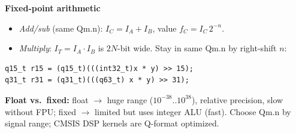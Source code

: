 \textbf{Fixed-point arithmetic}
\begin{itemize}
\item \emph{Add/sub} (same Qm.n): $I_C = I_A + I_B$, value $f_C = I_C\,2^{-n}$.
\item \emph{Multiply}: $I_T = I_A\cdot I_B$ is $2N$-bit wide. Stay in same Qm.n by right-shift $n$:
\end{itemize}
\begin{lstlisting}[language={}]
q15_t r15 = (q15_t)(((int32_t)x * y) >> 15);
q31_t r31 = (q31_t)(((q63_t) x * y) >> 31);
\end{lstlisting}

\textbf{Float vs.\ fixed:} float $\to$ huge range ($10^{-38}\!..\!10^{38}$), relative precision, slow without FPU; fixed $\to$ limited but uses integer ALU (fast). Choose Qm.n by signal range; CMSIS DSP kernels are Q-format optimized.
